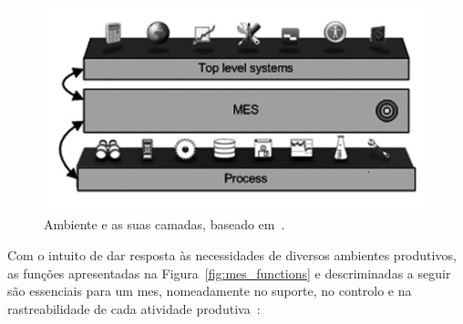 \begin{figure}[!ht]
    \centering
    \includegraphics[width=.75\textwidth]{ch02/assets/mes_layers.jpg}
    \caption{Ambiente  e as suas camadas, baseado em~\textcite[p.~526]{mes_literature_review}.}
    \label{fig:mes_layers}
\end{figure}

Com o intuito de dar resposta às necessidades de diversos ambientes produtivos, as funções apresentadas na Figura~\ref{fig:mes_functions} e descriminadas a seguir são essenciais para um \gls{mes}, nomeadamente no suporte, no controlo e na rastreabilidade de cada atividade produtiva~\parencite{mes_literature_review, mes_explained_high_level_vision, introduction_mes}:

